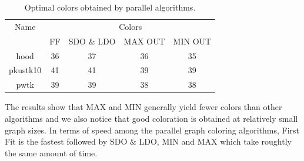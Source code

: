 \documentclass[preprint]{sigplanconf}
\begin{document}
\begin{table}[!ht]
\scriptsize
\begin{tabular}{c c c c c }
\hline
Name & \multicolumn{4}{c}{Colors} \\ \cline{2-5}
 & FF & SDO $\&$ LDO  & MAX OUT & MIN OUT \\
\hline
hood & 36 & 37 & 36 & 35 \\
pkustk10 & 41 & 41 & 39 & 39\\
pwtk & 39 & 39 & 38 & 38\\
\end{tabular}
\caption{ Optimal colors obtained by parallel algorithms.}
\label{tbl:colors}
\end{table}
The results show that MAX and MIN generally yield fewer colors than other algorithms and we also notice that good coloration is obtained at relatively small graph sizes.
In terms of speed among the parallel graph coloring algorithms, First Fit is the fastest followed by SDO $\&$ LDO, MIN and MAX which take roughtly the same amount of time.

%
%
%
%
%
\end{document}
